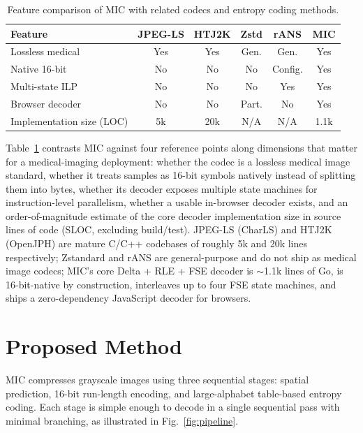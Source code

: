 \documentclass[journal]{IEEEtran}
\begin{document}
\begin{table}[htbp]
\centering
\caption{Feature comparison of MIC with related codecs and entropy coding
methods.}
\label{tab:positioning}
\scriptsize
\begin{tabular}{p{2.0cm}ccccc}
\toprule
Feature & JPEG-LS & HTJ2K & Zstd & rANS & MIC \\
\midrule
Lossless medical & Yes & Yes & Gen. & Gen. & Yes \\
Native 16-bit & No & No & No & Config. & Yes \\
Multi-state ILP & No & No & No & Yes & Yes \\
Browser decoder & No & No & Part. & No & Yes \\
Implementation size (LOC) & 5k & 20k & N/A & N/A & 1.1k \\
\bottomrule
\end{tabular}

\vspace{0.5em}
\footnotesize
Table~\ref{tab:positioning} contrasts MIC against four reference points along
dimensions that matter for a medical-imaging deployment: whether the codec is a
lossless medical image standard, whether it treats samples as 16-bit symbols
natively instead of splitting them into bytes, whether its decoder exposes
multiple state machines for instruction-level parallelism, whether a usable
in-browser decoder exists, and an order-of-magnitude estimate of the core
decoder implementation size in source lines of code (SLOC, excluding
build/test). JPEG-LS (CharLS) and HTJ2K (OpenJPH) are mature C/C++ codebases
of roughly 5k and 20k lines respectively; Zstandard and rANS are
general-purpose and do not ship as medical image codecs; MIC's core Delta +
RLE + FSE decoder is ${\sim}$1.1k lines of Go, is 16-bit-native by construction,
interleaves up to four FSE state machines, and ships a zero-dependency
JavaScript decoder for browsers.
\normalsize
\end{table}

\section{Proposed Method}
\label{sec:pipeline}

MIC compresses grayscale images using three sequential stages: spatial
prediction, 16-bit run-length encoding, and large-alphabet table-based entropy
coding. Each stage is simple enough to decode in a single sequential pass with
minimal branching, as illustrated in Fig.~\ref{fig:pipeline}.
\end{document}
